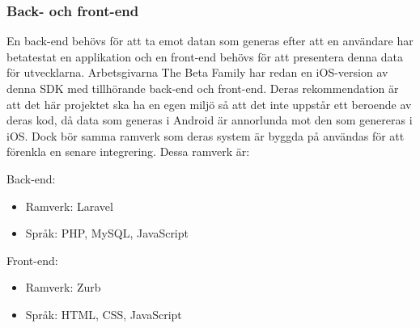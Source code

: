 \subsubsection{Back- och front-end}
\label{subsubsec:backfront}
En back-end behövs för att ta emot datan som generas efter att en användare har betatestat en applikation och en front-end behövs för att presentera denna data för utvecklarna. Arbetsgivarna The Beta Family har redan en iOS-version av denna SDK med tillhörande back-end och front-end. Deras rekommendation är att det här projektet ska ha en egen miljö så att det inte uppstår ett beroende av deras kod, då data som generas i Android är annorlunda mot den som genereras i iOS. Dock bör samma ramverk som deras system är byggda på användas för att förenkla en senare integrering. Dessa ramverk är:

Back-end:
\begin{itemize}
	\item Ramverk: Laravel
	\item Språk: PHP, MySQL, JavaScript
\end{itemize}

Front-end:
\begin{itemize}
	\item Ramverk: Zurb
	\item Språk: HTML, CSS, JavaScript
\end{itemize}
